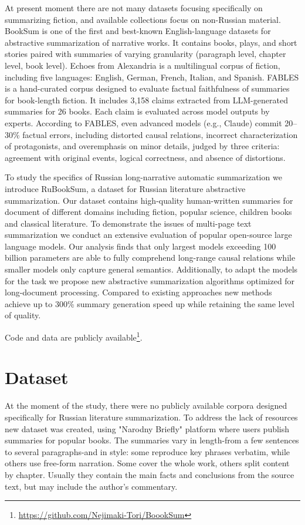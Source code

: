 \documentclass{superfri}
\begin{document}
At present moment there are not many datasets focusing specifically on summarizing fiction, and available collections focus on non-Russian material.
BookSum \cite{BookSum} is one of the first and best-known English-language datasets for abstractive summarization of narrative works. 
It contains books, plays, and short stories paired with summaries of varying granularity (paragraph level, chapter level, book level).
Echoes from Alexandria \cite{alexandria} is a multilingual corpus of fiction, including five languages: English, German, French, Italian, and Spanish.
FABLES \cite{fables} is a hand-curated corpus designed to evaluate factual faithfulness of summaries for book-length fiction.
It includes 3,158 claims extracted from LLM-generated summaries for 26 books.
Each claim is evaluated across model outputs by experts.
According to FABLES, even advanced models (e.g., Claude) commit 20–30\% factual errors, including distorted
causal relations, incorrect characterization of protagonists, and overemphasis on minor details,
judged by three criteria: agreement with original events, logical correctness, and absence of distortions.

To study the specifics of  Russian long-narrative automatic summarization we introduce RuBookSum, a dataset for Russian literature abstractive summarization. 
Our dataset contains high-quality human-written summaries for document of different domains including fiction, popular science, children books and classical literature.
To demonstrate the issues of multi-page text summarization we conduct an extensive evaluation of popular open-source large language models. 
Our analysis finds that only largest models exceeding 100 billion parameters are able to fully comprehend long-range causal relations while smaller models 
only capture general semantics. Additionally, to adapt the models for the task we propose new abstractive summarization algorithms optimized for long-document processing. 
Compared to existing approaches new methods achieve up to 300\% summary generation speed up while retaining the same level of quality.

Code and data are publicly available\footnote{\label{git}\url{https://github.com/Nejimaki-Tori/BoookSum}}.


\section{Dataset}
At the moment of the study, there were no publicly available corpora designed specifically for Russian literature summarization.
To address the lack of resources new dataset was created, using "Narodny Briefly" platform \cite{Briefly} where users publish summaries for popular books.
The summaries vary in length-from a few sentences to several paragraphs-and in style: some reproduce key phrases verbatim, 
while others use free-form narration. Some cover the whole work, others split content by chapter.
Usually they contain the main facts and conclusions from the source text, but may include the author’s commentary.
\end{document}
